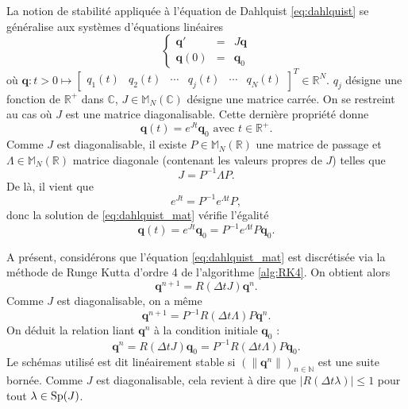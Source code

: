 La notion de stabilité appliquée à l'équation de Dahlquist \eqref{eq:dahlquist} se généralise aux systèmes d'équations linéaires
\begin{equation}
\left\lbrace
\begin{array}{rcl}
\mathbf{q}' & = & J \mathbf{q} \\
\mathbf{q}(0) & = & \mathbf{q}_0 
\end{array}
\right.
\label{eq:dahlquist_mat}
\end{equation}
où $\mathbf{q} : t>0 \mapsto \begin{bmatrix}
q_1(t) & q_2(t) & \cdots & q_j(t) & \cdots & q_N(t)
\end{bmatrix}^T \in \mathbb{R}^N$.
$q_j$ désigne une fonction de $\mathbb{R}^+$ dans $\mathbb{C}$, $J \in \mathbb{M}_N (\mathbb{C})$ désigne une matrice carrée. On se restreint au cas où $J$ est une matrice diagonalisable.
Cette dernière propriété donne
\begin{equation}
\mathbf{q}(t) = e^{Jt}\mathbf{q}_0 \text{ avec } t \in \mathbb{R}^+.
\end{equation}
Comme $J$ est diagonalisable, il existe $P \in \mathbb{M}_N(\mathbb{R})$ une matrice de passage et $\Lambda \in \mathbb{M}_N(\mathbb{R})$ matrice diagonale (contenant les valeurs propres de $J$) telles que
\begin{equation}
J = P^{-1} \Lambda P.
\end{equation}
De là, il vient que 
\begin{equation}
e^{Jt} = P^{-1}e^{\Lambda t}P,
\end{equation}
donc la solution de \eqref{eq:dahlquist_mat} vérifie l'égalité 
\begin{equation}
\mathbf{q}(t) = e^{Jt}\mathbf{q}_0 = P^{-1}e^{\Lambda t}P\mathbf{q}_0.
\end{equation}

A présent, considérons que l'équation \eqref{eq:dahlquist_mat} est discrétisée via la méthode de Runge Kutta d'ordre 4 de l'algorithme \ref{alg:RK4}. On obtient alors 
\begin{equation}
\mathbf{q}^{n+1} = R(\Delta t J) \mathbf{q}^n.
\end{equation}
Comme $J$ est diagonalisable, on a même
\begin{equation}
\mathbf{q}^{n+1} = P^{-1}R(\Delta t \Lambda)P \mathbf{q}^n.
\end{equation}
On déduit la relation liant $\mathbf{q}^n$ à la condition initiale $\mathbf{q}_0$ : 
\begin{equation}
\mathbf{q}^n = R(\Delta t J) \mathbf{q}_0 = P^{-1}R(\Delta t \Lambda)P \mathbf{q}_0.
\end{equation}
Le schémas utilisé est dit linéairement stable si $\left( \| \mathbf{q}^n \| \right)_{n \in \mathbb{N}}$ est une suite bornée. Comme $J$ est diagonalisable, cela revient à dire que $| R(\Delta t \lambda) | \leq 1$ pour tout $\lambda \in \text{Sp}(J)$.


